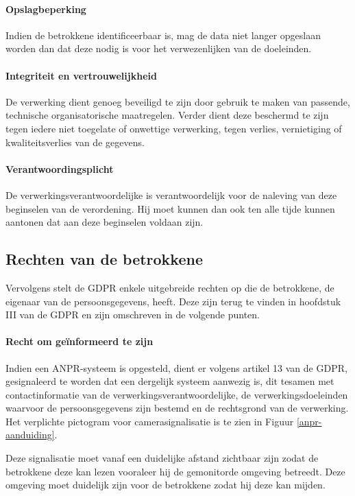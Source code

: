 \paragraph{Opslagbeperking}
Indien de betrokkene identificeerbaar is, mag de data niet langer opgeslaan worden dan dat deze nodig is voor het verwezenlijken van de doeleinden.

\paragraph{Integriteit en vertrouwelijkheid}
De verwerking dient genoeg beveiligd te zijn door gebruik te maken van passende, technische organisatorische maatregelen. Verder dient deze beschermd te zijn tegen iedere niet toegelate of onwettige verwerking, tegen verlies, vernietiging of kwaliteitsverlies van de gegevens.

\paragraph{Verantwoordingsplicht}
De verwerkingsverantwoordelijke is verantwoordelijk voor de naleving van deze beginselen van de verordening. Hij moet kunnen dan ook ten alle tijde kunnen aantonen dat aan deze beginselen voldaan zijn.


\subsection{Rechten van de betrokkene}
\label{rechten-betrokkene}
Vervolgens stelt de GDPR enkele uitgebreide rechten op die de betrokkene, de eigenaar van de persoonsgegevens, heeft. Deze zijn terug te vinden in hoofdstuk III van de GDPR en zijn omschreven in de volgende punten.

\paragraph{Recht om geïnformeerd te zijn}
Indien een ANPR-systeem is opgesteld, dient er volgens artikel 13 van de GDPR, gesignaleerd te worden dat een dergelijk systeem aanwezig is, dit tesamen met contactinformatie van de verwerkingsverantwoordelijke, de verwerkingsdoeleinden waarvoor de persoonsgegevens zijn bestemd en de rechtsgrond van de verwerking. Het verplichte pictogram voor camerasignalisatie is te zien in Figuur \ref{anpr-aanduiding}.

Deze signalisatie moet vanaf een duidelijke afstand zichtbaar zijn zodat de betrokkene deze kan lezen vooraleer hij de gemonitorde omgeving betreedt. Deze omgeving moet duidelijk zijn voor de betrokkene zodat hij deze kan mijden.

